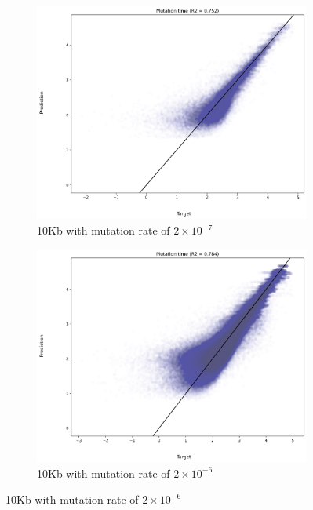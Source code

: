 \begin{figure}[htp]
\centering
\begin{subfigure}[b]{.51\linewidth}
    \includegraphics[width=\linewidth]{tsnn_figs/tsnn_ntrain_900_clen_10kb_mut-rate_2e-7_ssize_100_scatter_val.jpg}
    \caption{10Kb with mutation rate of $2\times10^{-7}$}\label{fig:10kb_7}
\end{subfigure}
\hfill
\begin{subfigure}[b]{.51\linewidth}
    \includegraphics[width=\linewidth]{tsnn_figs/tsnn_ntrain_900_clen_10kb_mut-rate_2e-6_ssize_100_scatter_val.jpg}
\caption{10Kb with mutation rate of $2\times10^{-6}$}\label{fig:10kb_6}

\end{subfigure}
\end{figure}
